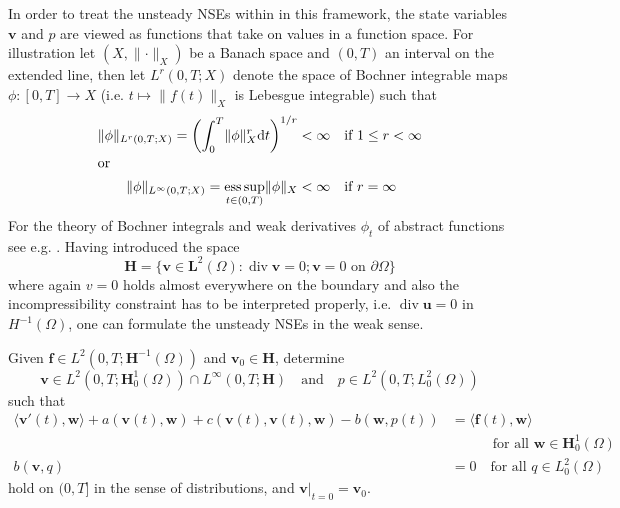 \documentclass[a4paper,10pt,BCOR=15mm]{scrbook}
\DeclareMathOperator{\dive}{div}
\providecommand{\norm}[1]{\lVert#1 \rVert}
\providecommand{\dupa}[2]{\langle #1,#2 \rangle}
\providecommand{\inva}[1]{\text{d} #1}
\providecommand{\andi}[0]{\quad \text{and} \quad}
\providecommand{\esssup}{\mathop{\mathrm{ess\,sup}}\displaylimits}
\begin{document}
In order to treat the unsteady NSEs within in this framework, the state variables $\mathbf v$ and $p$ are viewed as functions that take on values in a function space. For illustration let $(X,\norm{\cdot}_X)$ be a Banach space and $(0,T)$ an interval on the extended line, then let $L^r(0,T;X)$ denote the space of Bochner integrable maps $\phi:[0,T]\rightarrow X$ (i.e. $t \mapsto \norm{f(t)}_X$ is Lebesgue integrable) such that
\begin{subequations}
 \begin{align*}
\norm{\phi}_{L^r(0,T;X)} = \biggl ( \int _0 ^T \norm{\phi}^r_X \inva{t} \biggr ) ^ {1/r} < \infty \quad &\text{if } 1 \leq r < \infty \\
\intertext{or}
\norm{\phi}_{L^\infty(0,T;X)} = \esssup _ {t \in (0,T)} \norm{\phi}_X< \infty \quad &\text{if } r = \infty
 \end{align*}
\end{subequations}
For the theory of Bochner integrals and weak derivatives $\phi_t$ of abstract functions see e.g. \cite{emmr}. Having introduced the space
\begin{equation*}
 \mathbf H = \{ \mathbf v \in \mathbf L ^2(\Omega) : \dive \mathbf v = 0; \mathbf v = 0 \text{ on } \partial \Omega \}
\end{equation*}
where again $v=0$ holds almost everywhere on the boundary and also the incompressibility constraint has to be interpreted properly, i.e. $\dive \mathbf u = 0$ in $H^{-1}(\Omega)$, one can formulate the unsteady NSEs in the weak sense.

\begin{prob}\label{prnsetem}
 Given $\mathbf f \in L^2(0,T;\mathbf H ^{-1}(\Omega))$ and $\mathbf v _0 \in \mathbf H$, determine 
\begin{equation*}
 \mathbf v \in L^2(0,T;\mathbf H ^1_0 (\Omega)) \cap L^\infty (0,T;\mathbf H) \andi p \in L^2(0,T;L ^2_0 (\Omega))
\end{equation*}
  such that
\begin{subequations}
\begin{align*}
 \dupa { \mathbf v'(t)}{ \mathbf w } + a(\mathbf v(t), \mathbf w) + c(\mathbf v(t),\mathbf v(t), \mathbf w)-b(\mathbf w, p(t))&=\dupa{\mathbf f(t)}{\mathbf w} \\ & \quad\quad\quad \text{for all } \mathbf w \in \mathbf H_0^1(\Omega)  \\
b(\mathbf v, q) &= 0 \quad \text{for all }q \in L_0^2(\Omega)
 \end{align*}
\end{subequations}
hold on $(0,T]$ in the sense of distributions, and $\mathbf v \vert _{t=0} = \mathbf v_0$.
\end{prob}
\end{document}
